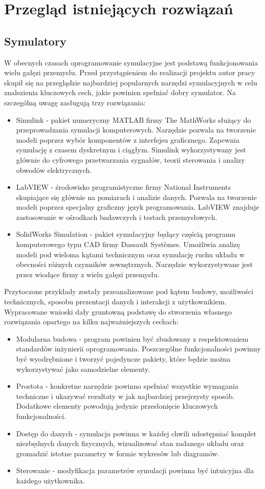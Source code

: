 \documentclass[12pt, twoside, openany]{report}
\theoremstyle{definition}
\begin{document}
\section{Przegląd istniejących rozwiązań}
\subsection{Symulatory}
W obecnych czasach oprogramowanie symulacyjne jest podstawą funkcjonowania wielu gałęzi przemysłu. Przed przystąpieniem do realizacji projektu autor pracy skupił się na przeglądzie najbardziej popularnych narzędzi symulacyjnych w celu znalezienia kluczowych cech, jakie powinien spełniać dobry symulator. Na szczególną uwagę zasługują trzy rozwiązania:
\begin{itemize}
\item Simulink - pakiet numeryczny MATLAB firmy The MathWorks służący do przeprowadzania symulacji komputerowych. Narzędzie pozwala na tworzenie modeli poprzez wybór komponentów z interfejsu graficznego. Zapewnia symulację z czasem dyskretnym i ciągłym. Simulink wykorzystywany jest głównie do cyfrowego przetwarzania sygnałów, teorii sterowania i analizy obwodów elektrycznych.
\item LabVIEW - środowisko programistyczne firmy National Instruments skupiające się głównie na pomiarach i analizie danych. Pozwala na tworzenie modeli poprzez specjalny graficzny język programowania. LabVIEW znajduje zastosowanie w ośrodkach badawczych i testach przemysłowych.
\item SolidWorks Simulation - pakiet symulacyjny będący częścią programu komputerowego typu CAD firmy Dassault Systèmes. Umożliwia analizę modeli pod wieloma kątami technicznym oraz symulację ruchu układu w obecności różnych czynników zewnętrznych. Narzędzie wykorzystywane jest przez wiodące firmy z wielu gałęzi przemysłu.  
\end{itemize}

Przytoczone przykłady zostały przeanalizowane pod kątem budowy, możliwości technicznych, sposobu prezentacji danych i interakcji z użytkownikiem. Wypracowane wnioski dały gruntowną podstawę do stworzenia własnego rozwiązania opartego na kilku najważniejszych cechach:
\begin{itemize}
\item Modularna budowa - program powinien być zbudowany z respektowaniem standardów inżynierii oprogramowania. Poszczególne funkcjonalności powinny być wyodrębnione i tworzyć pojedyncze pakiety, które będzie można wykorzystywać jako samodzielne elementy.
\item Prostota - konkretne narzędzie powinno spełniać wszystkie wymagania techniczne i ukazywać rezultaty w jak najbardziej przejrzysty sposób. Dodatkowe elementy powodują jedynie przesłonięcie kluczowych funkcjonalności.
\item Dostęp do danych - symulacja powinna w każdej chwili udostępniać komplet niezbędnych danych fizycznych, wizualizować stan zadanego układu oraz gromadzić istotne parametry w formie wykresów lub diagramów.
\item Sterowanie - modyfikacja parametrów symulacji powinna być intuicyjna dla każdego użytkownika.
\end{itemize}
\end{document}
